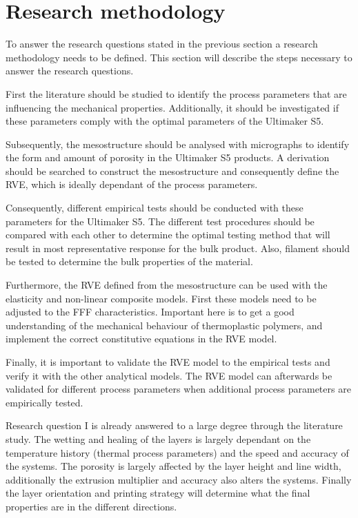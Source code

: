 
\section{Research methodology}
To answer the research questions stated in the previous section a research methodology needs to be defined. This section will describe the steps necessary to answer the research questions. 

First the literature should be studied to identify the process parameters that are influencing the mechanical properties. Additionally, it should be investigated if these parameters comply with the optimal parameters of the Ultimaker S5.

Subsequently, the mesostructure should be analysed with micrographs to identify the form and amount of porosity in the Ultimaker S5 products. A derivation should be searched to construct the mesostructure and consequently define the RVE, which is ideally dependant of the process parameters. 

Consequently, different empirical tests should be conducted with these parameters for the Ultimaker S5. The different test procedures should be compared with each other to determine the optimal testing method that will result in most representative response for the bulk product. Also, filament should be tested to determine the bulk properties of the material.

Furthermore, the RVE defined from the mesostructure can be used with the elasticity and non-linear composite models. First these models need to be adjusted to the FFF characteristics. Important here is to get a good understanding of the mechanical behaviour of thermoplastic polymers, and implement the correct constitutive equations in the RVE model.

Finally, it is important to validate the  RVE model to the empirical tests and verify it with the other analytical models. The RVE model can afterwards be validated for different process parameters when additional process parameters are empirically tested. 

Research question I is already answered to a large degree through the literature study. The wetting and healing of the layers is largely dependant on the temperature history (thermal process parameters) and the speed and accuracy of the systems. The porosity is largely affected by the layer height and line width, additionally the extrusion multiplier and accuracy also alters the systems. Finally the layer orientation and printing strategy will determine what the final properties are in the different directions. 


